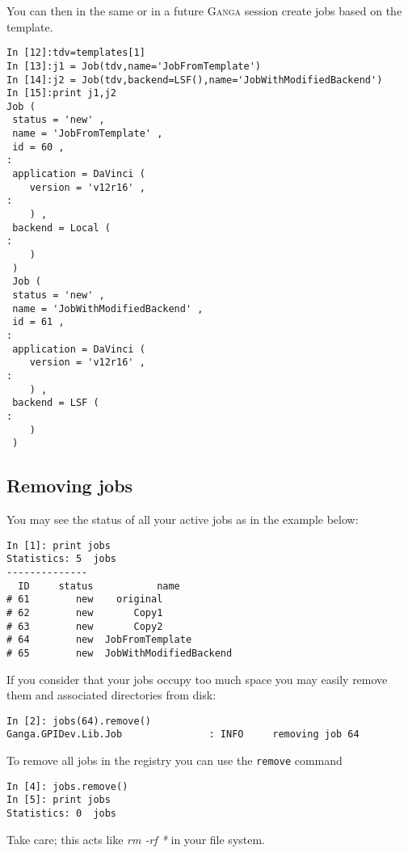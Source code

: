 \documentclass{howto}
\def\ganga {\textsc{Ganga}\xspace}
\begin{document}
You can then in the same or in a future \ganga session create jobs based on
the template.
\begin{verbatim}
In [12]:tdv=templates[1]
In [13]:j1 = Job(tdv,name='JobFromTemplate')
In [14]:j2 = Job(tdv,backend=LSF(),name='JobWithModifiedBackend')
In [15]:print j1,j2
Job (
 status = 'new' ,
 name = 'JobFromTemplate' ,
 id = 60 ,
:
 application = DaVinci (
    version = 'v12r16' ,
:
    ) ,
 backend = Local (
:
    ) 
 ) 
 Job (
 status = 'new' ,
 name = 'JobWithModifiedBackend' ,
 id = 61 ,
:
 application = DaVinci (
    version = 'v12r16' ,
:
    ) ,
 backend = LSF (
:
    ) 
 ) 
\end{verbatim}


\subsection{Removing jobs}
You may see the status of all your active jobs as in the example below:
\begin{verbatim}
In [1]: print jobs
Statistics: 5  jobs
--------------
  ID     status           name
# 61        new    original
# 62        new       Copy1
# 63        new       Copy2
# 64        new  JobFromTemplate
# 65        new  JobWithModifiedBackend
\end{verbatim}

If you consider that your jobs occupy too much space you may easily remove
them and associated directories from disk:
\begin{verbatim}
In [2]: jobs(64).remove()
Ganga.GPIDev.Lib.Job               : INFO     removing job 64
\end{verbatim}
To remove all jobs in the registry you can use the \texttt{remove} command
\begin{verbatim}
In [4]: jobs.remove()
In [5]: print jobs
Statistics: 0  jobs
\end{verbatim}
Take care; this acts like \emph{rm -rf *} in your file system.
\end{document}
